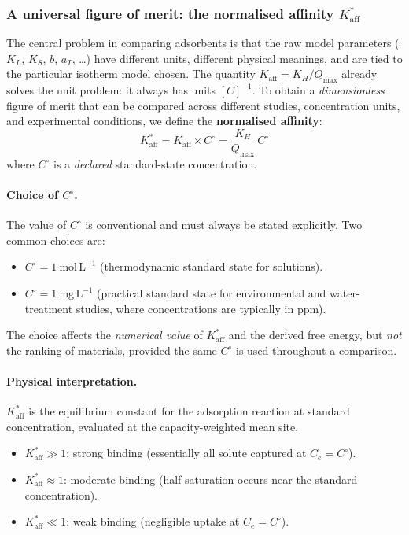 \documentclass[12pt]{article}
\begin{document}
	\subsubsection{A universal figure of merit: the normalised affinity
		$K_{\mathrm{aff}}^{\ast}$}

	The central problem in comparing adsorbents is that the raw
	model parameters ($K_L$, $K_S$, $b$, $a_T$, \ldots) have
	different units, different physical meanings, and are tied to the
	particular isotherm model chosen.
	The quantity $K_{\mathrm{aff}} = K_H / Q_{\max}$ already solves the
	unit problem: it always has units $[C]^{-1}$.
	To obtain a \emph{dimensionless} figure of merit that can be
	compared across different studies, concentration units, and
	experimental conditions, we define the \textbf{normalised affinity}:
	\begin{equation}
		\boxed{
			K_{\mathrm{aff}}^{\ast}
			= K_{\mathrm{aff}} \times C^\circ
			= \frac{K_H}{Q_{\max}}\, C^\circ
		}
		\label{eq:Kaff_star}
	\end{equation}
	where $C^\circ$ is a \emph{declared} standard-state concentration.

	\paragraph{Choice of $C^\circ$.}
	The value of $C^\circ$ is conventional and must always be stated
	explicitly.  Two common choices are:
	\begin{itemize}
		\item $C^\circ = 1~\mathrm{mol\,L^{-1}}$
		(thermodynamic standard state for solutions).
		\item $C^\circ = 1~\mathrm{mg\,L^{-1}}$ (practical standard
		state for environmental and water-treatment studies, where
		concentrations are typically in ppm).
	\end{itemize}
	The choice affects the \emph{numerical value} of
	$K_{\mathrm{aff}}^{\ast}$ and the derived free energy, but
	\emph{not} the ranking of materials, provided the same $C^\circ$
	is used throughout a comparison.

	\paragraph{Physical interpretation.}
	$K_{\mathrm{aff}}^{\ast}$ is the equilibrium constant for the
	adsorption reaction at standard concentration, evaluated at the
	capacity-weighted mean site.
	\begin{itemize}
		\item $K_{\mathrm{aff}}^{\ast} \gg 1$: strong binding
		(essentially all solute captured at $C_e = C^\circ$).
		\item $K_{\mathrm{aff}}^{\ast} \approx 1$: moderate binding
		(half-saturation occurs near the standard concentration).
		\item $K_{\mathrm{aff}}^{\ast} \ll 1$: weak binding
		(negligible uptake at $C_e = C^\circ$).
	\end{itemize}
\end{document}
